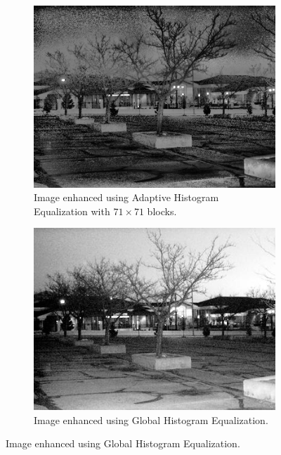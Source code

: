 \documentclass[a4paper, landscape]{article}
\begin{document}
\begin{figure}
\begin{subfigure}{0.32\linewidth}
    \end{subfigure}
    \begin{subfigure}{0.32\linewidth}
        \centering
        \includegraphics[width=\linewidth]{chonky_enhanced_LC1.png}
        \caption{Image enhanced using Adaptive Histogram Equalization with $71\times 71$ blocks.}
    \end{subfigure}
    \begin{subfigure}{0.32\linewidth}
        \centering
        \includegraphics[width=\linewidth]{global_histogram_LC1.jpg}
        \caption{Image enhanced using Global Histogram Equalization.}
    \end{subfigure}
\end{figure}
\end{document}
